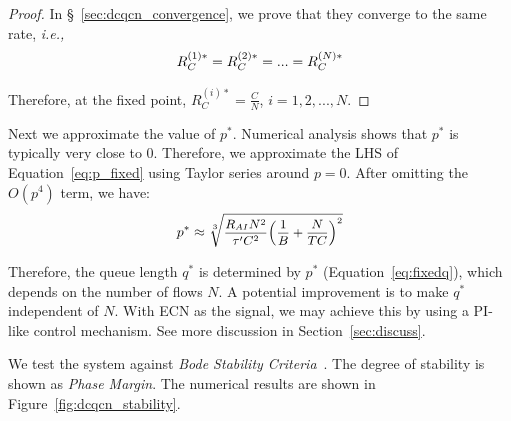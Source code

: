 \begin{proof}
In \S~\ref{sec:dcqcn_convergence}, we prove that  they converge to the same rate, {\em i.e.,}
\begin{equation}
\small
R_C^{(1)*} = R_C^{(2)*} = ... = R_C^{(N)*}
\end{equation}
 
Therefore, at the fixed point,  $R_C^{(i)*} = \frac{C}{N}$, $i = 1, 2, ..., N$.
\end{proof}

Next we approximate the value of $p^*$. Numerical analysis shows that $p^*$ is 
typically very close to 0. Therefore, we approximate the LHS of Equation~\ref{eq:p_fixed} 
using Taylor series around $p=0$.
After omitting the $O(p^4)$ term, we have:
\begin{equation}
\small
{p^*} \approx \sqrt[3]{{\frac{{{R_{AI}N^2}}}{{{\tau '}C^2}}{{\left( {\frac{1}{B} + \frac{N}{TC}} \right)}^2}}}
\label{eq:fixedp}
\end{equation}

Therefore, the queue length $q^*$ is determined by $p^*$ (Equation~\ref{eq:fixedq}), which depends on 
the number of flows $N$. A potential improvement is to make $q^*$ independent of 
$N$. With ECN as the signal, we may achieve this
by using a PI-like control mechanism. See more discussion in Section~\ref{sec:discuss}.



We test the system against {\em Bode Stability Criteria}~\cite{controltheory}.
The degree of stability is shown as {\em Phase Margin}.
The numerical results are shown in Figure~\ref{fig:dcqcn_stability}. 

